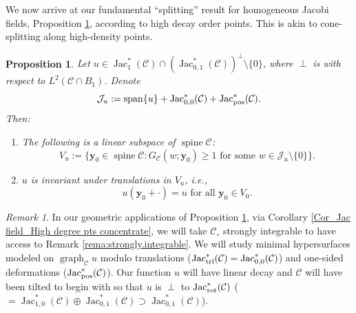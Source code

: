 \documentclass[11pt, letterpaper, reqno]{amsart}
\numberwithin{equation}{section}
\newtheorem{Prop}[Def]{Proposition}
\theoremstyle{remark}
\newtheorem{Rem}[Def]{Remark}
\newcommand{\cC}{\mathcal{C}}
\newcommand{\cJ}{\mathcal{J}}
\newcommand{\mbfy}{\mathbf{y}}
\newcommand{\graph}{\operatorname{graph}}
\newcommand{\Jac}{\operatorname{Jac}}
\newcommand{\spine}{\operatorname{spine}}
\begin{document}
We now arrive at our fundamental ``splitting'' result for homogeneous Jacobi fields, Proposition \ref{Prop_Jac field_Max deg mod transl}, according to high decay order points. This is akin to cone-splitting along high-density points.

    \begin{Prop} \label{Prop_Jac field_Max deg mod transl}
        Let $u\in \Jac^*_1(\cC) \cap (\Jac^*_{0,1}(\cC))^\perp \setminus \{0\}$, where $\perp$ is with respect to $L^2(\cC \cap B_1)$. Denote
        \[ \cJ_u:= \operatorname{span} \{ u \} + \Jac^*_{0,0}(\cC) +\Jac_\textnormal{pos}^*(\cC). \]
        Then:
        \begin{enumerate}
        	\item[(i)] The following is a linear subspace of  $\spine \cC$:
        		\[ V_u := \{\mbfy_0 \in \spine \cC : G_\cC(w; \mbfy_0) \geq 1 \text{ for some } w \in \cJ_u \setminus \{0\} \}. \]
        \item[(ii)] $u$ is invariant under translations in $V_u$, i.e., 
        		\[ u(\mbfy_0 + \cdot) = u \text{ for all } \mbfy_0 \in V_0. \]
        \end{enumerate}
    \end{Prop}

\begin{Rem} \label{rema:splitting}
	In our geometric applications of Proposition \ref{Prop_Jac field_Max deg mod transl}, via Corollary \ref{Cor_Jac field_High degree pts concentrate}, we will take $\cC_\circ$ strongly integrable to have access to Remark \ref{rema:strongly.integrable}. We will study minimal hypersurfaces modeled on $\graph_\cC u$ modulo translations ($\Jac^*_{\textnormal{trl}}(\cC) = \Jac^*_{0,0}(\cC)$) and one-sided deformations ($\Jac^*_{\textnormal{pos}}(\cC)$). Our function $u$ will have linear decay and $\cC$ will have been tilted to begin with so that $u$ is $\perp$ to $\Jac^*_{\textnormal{rot}}(\cC)$ ($= \Jac^*_{1,0}(\cC) \oplus \Jac^*_{0,1}(\cC) \supset \Jac^*_{0,1}(\cC)$). 
\end{Rem}
\end{document}
